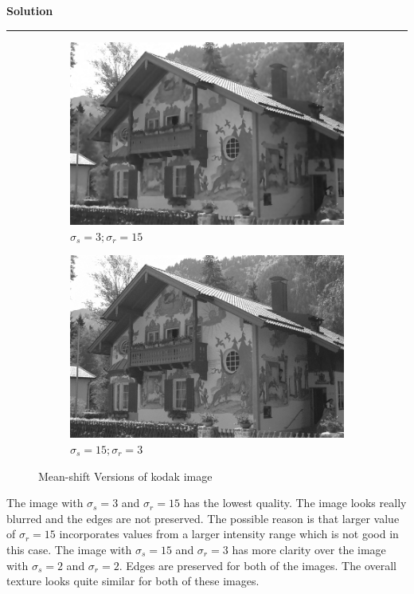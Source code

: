 \documentclass[a4paper,12pt]{article}
\newenvironment{solution}[2][]{%
    \begin{mdframed}[linecolor=green!60!black, linewidth=2pt, roundcorner=10pt, backgroundcolor=green!5!white, skipabove=12pt, skipbelow=12pt]%
        \textbf{\large #2} %
        \par\noindent\rule{\textwidth}{0.4pt} %
        \vspace{0.5em} %
}{%
    \end{mdframed}%
}
\begin{document}
\begin{solution}{Solution}
\begin{figure}[H]
    \begin{subfigure}[b]{0.24\textwidth}
        \centering
        \includegraphics[width=\textwidth]{../images/filtered_kodak24_meanshift_sigma_s_3_sigma_r_15.png}
        \caption{$\sigma_s=3;\sigma_r=15$}
        \label{fig:subfig3}
    \end{subfigure}
    \begin{subfigure}[b]{0.24\textwidth}
        \centering
        \includegraphics[width=\textwidth]{../images/filtered_kodak24_meanshift_sigma_s_15_sigma_r_3.png}
        \caption{$\sigma_s=15;\sigma_r=3$}
        \label{fig:subfig3}
    \end{subfigure}
    
    \caption{Mean-shift Versions of kodak image}
    \label{fig:overall}
\end{figure}

The image with $\sigma_s=3$ and $\sigma_r=15$ has the lowest quality. The image looks really blurred and the edges are not preserved. The possible reason is that larger value of $\sigma_r=15$ incorporates values from a larger intensity range which is not good in this case. The image with $\sigma_s=15$ and $\sigma_r=3$ has more clarity over the image with $\sigma_s=2$ and $\sigma_r=2$. Edges are preserved for both of the images. The overall texture looks quite similar for both of these images.

\end{solution}
\end{document}
